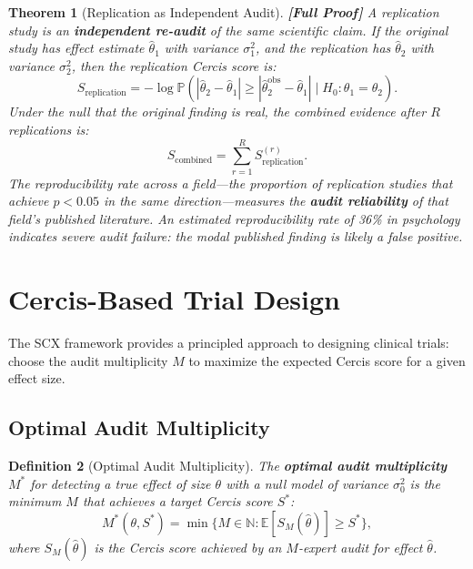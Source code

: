 \documentclass[12pt,a4paper]{article}
\newtheorem{theorem}{Theorem}[section]
\newtheorem{definition}[theorem]{Definition}
\theoremstyle{remark}
\newcommand{\N}{\mathbb{N}}
\newcommand{\E}{\mathbb{E}}
\newcommand{\Pbb}{\mathbb{P}}
\newcommand{\SCX}{\textsf{SCX}}
\newcommand{\Cercis}{\textsf{Cercis}}
\newcommand{\rigorFull}{\textbf{[Full Proof]}}
\begin{document}
\begin{theorem}[Replication as Independent Audit]
\label{thm:replication_audit}
\rigorFull
A replication study is an \textbf{independent re-audit} of the same
scientific claim. If the original study has effect estimate $\hat{\theta}_1$
with variance $\sigma_1^2$, and the replication has $\hat{\theta}_2$ with
variance $\sigma_2^2$, then the replication \Cercis{} score is:
\begin{equation}
  S_{\text{replication}} = -\log \Pbb(|\hat{\theta}_2 - \hat{\theta}_1|
  \geq |\hat{\theta}_2^{\text{obs}} - \hat{\theta}_1|
  \mid H_0: \theta_1 = \theta_2).
\end{equation}
Under the null that the original finding is real, the combined evidence
after $R$ replications is:
\begin{equation}
  S_{\text{combined}} = \sum_{r=1}^R S_{\text{replication}}^{(r)}.
\end{equation}
The reproducibility rate across a field---the proportion of replication
studies that achieve $p < 0.05$ in the same direction---measures the
\textbf{audit reliability} of that field's published literature. An
estimated reproducibility rate of 36\% in psychology~\cite{open_science2015}
indicates severe audit failure: the modal published finding is likely a
false positive.
\end{theorem}


\section{Cercis-Based Trial Design}
\label{sec:trial_design}

The \SCX{} framework provides a principled approach to designing clinical
trials: choose the audit multiplicity $M$ to maximize the expected
\Cercis{} score for a given effect size.

\subsection{Optimal Audit Multiplicity}

\begin{definition}[Optimal Audit Multiplicity]
\label{def:optimal_m}
The \textbf{optimal audit multiplicity} $M^*$ for detecting a true effect
of size $\theta$ with a null model of variance $\sigma_0^2$ is the
minimum $M$ that achieves a target \Cercis{} score $S^*$:
\begin{equation}
  M^*(\theta, S^*) = \min \{M \in \N : \E[S_M(\hat{\theta})] \geq S^*\},
\end{equation}
where $S_M(\hat{\theta})$ is the \Cercis{} score achieved by an $M$-expert
audit for effect $\hat{\theta}$.
\end{definition}
\end{document}
